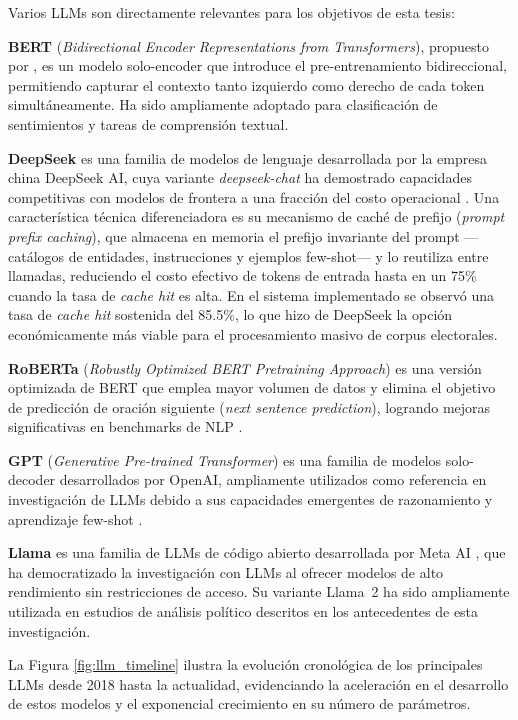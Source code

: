 \documentclass[listof=nochaptergap,12pt,times,authoryear]{report}
\let\cite\textcite
\begin{document}
Varios LLMs son directamente relevantes para los objetivos de esta tesis:
 
\textbf{BERT} (\textit{Bidirectional Encoder Representations from Transformers}), propuesto por \cite{tec_devlin2018bert}, es un modelo solo-encoder que introduce el pre-entrenamiento bidireccional, permitiendo capturar el contexto tanto izquierdo como derecho de cada token simultáneamente. Ha sido ampliamente adoptado para clasificación de sentimientos y tareas de comprensión textual.
 
\textbf{DeepSeek} es una familia de modelos de lenguaje desarrollada por la empresa china DeepSeek AI, cuya variante \textit{deepseek-chat} ha demostrado capacidades competitivas con modelos de frontera a una fracción del costo operacional \parencite{tec_deepseek2024}. Una característica técnica diferenciadora es su mecanismo de caché de prefijo (\textit{prompt prefix caching}), que almacena en memoria el prefijo invariante del prompt —catálogos de entidades, instrucciones y ejemplos few-shot— y lo reutiliza entre llamadas, reduciendo el costo efectivo de tokens de entrada hasta en un 75\% cuando la tasa de \textit{cache hit} es alta. En el sistema implementado se observó una tasa de \textit{cache hit} sostenida del 85.5\%, lo que hizo de DeepSeek la opción económicamente más viable para el procesamiento masivo de corpus electorales.

\textbf{RoBERTa} (\textit{Robustly Optimized BERT Pretraining Approach}) es una versión optimizada de BERT que emplea mayor volumen de datos y elimina el objetivo de predicción de oración siguiente (\textit{next sentence prediction}), logrando mejoras significativas en benchmarks de NLP \parencite{tec_liu2019roberta}.
 
\textbf{GPT} (\textit{Generative Pre-trained Transformer}) es una familia de modelos solo-decoder desarrollados por OpenAI, ampliamente utilizados como referencia en investigación de LLMs debido a sus capacidades emergentes de razonamiento y aprendizaje few-shot \parencite{tec_brown2020gpt3}.

\textbf{Llama} es una familia de LLMs de código abierto desarrollada por Meta AI \parencite{tec_touvron2023llama}, que ha democratizado la investigación con LLMs al ofrecer modelos de alto rendimiento sin restricciones de acceso. Su variante Llama~2 ha sido ampliamente utilizada en estudios de análisis político descritos en los antecedentes de esta investigación.
 
La Figura \ref{fig:llm_timeline} ilustra la evolución cronológica de los principales LLMs desde 2018 hasta la actualidad, evidenciando la aceleración en el desarrollo de estos modelos y el exponencial crecimiento en su número de parámetros.
 
\end{document}
